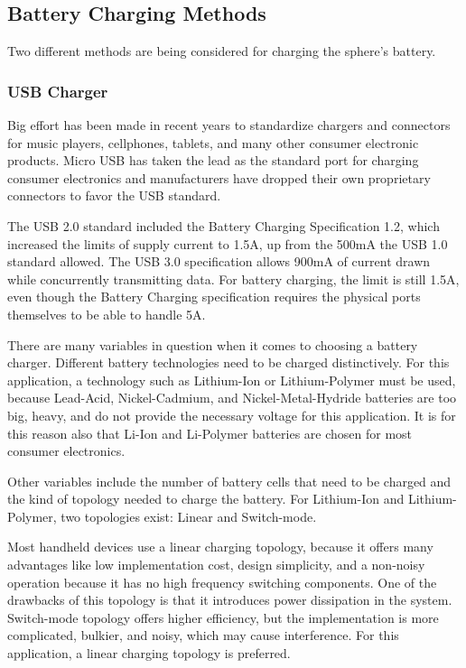 \subsection{Battery Charging Methods}
Two different methods are being considered for charging the sphere's battery.
\subsubsection{USB Charger}
Big effort has been made in recent years to standardize chargers and connectors for music players, cellphones, tablets, and many other consumer electronic products. Micro USB has taken the lead as the standard port for charging consumer electronics and manufacturers have dropped their own proprietary connectors to favor the USB standard.

The USB 2.0 standard included the Battery Charging Specification 1.2, which increased the limits of supply current to 1.5A, up from the 500mA the USB 1.0 standard allowed. The USB 3.0 specification allows 900mA of current drawn while concurrently transmitting data. For battery charging, the limit is still 1.5A, even though the Battery Charging specification requires the physical ports themselves to be able to handle 5A.

There are many variables in question when it comes to choosing a battery charger. Different battery technologies need to be charged distinctively. For this application, a technology such as Lithium-Ion or Lithium-Polymer must be used, because Lead-Acid, Nickel-Cadmium, and Nickel-Metal-Hydride batteries are too big, heavy, and do not provide the necessary voltage for this application. It is for this reason also that Li-Ion and Li-Polymer batteries are chosen for most consumer electronics.

Other variables include the number of battery cells that need to be charged and the kind of topology needed to charge the battery. For Lithium-Ion and Lithium-Polymer, two topologies exist: Linear and Switch-mode.

Most handheld devices use a linear charging topology, because it offers many advantages like low implementation cost, design simplicity, and a non-noisy operation because it has no high frequency switching components. One of the drawbacks of this topology is that it introduces power dissipation in the system. Switch-mode topology offers higher efficiency, but the implementation is more complicated, bulkier, and noisy, which may cause interference. For this application, a linear charging topology is preferred.

